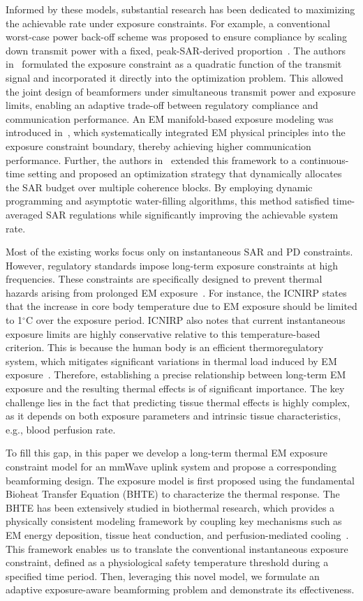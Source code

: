 \documentclass[journal]{IEEEtran}
\begin{document}
Informed by these models, substantial research has been dedicated to maximizing the achievable rate under exposure constraints. For example, a conventional worst-case power back-off scheme was proposed to ensure compliance by scaling down transmit power with a fixed, peak-SAR-derived proportion~\cite{ref14}. The authors in~\cite{ref15} formulated the exposure constraint as a quadratic function of the transmit signal and incorporated it directly into the optimization problem. This allowed the joint design of beamformers under simultaneous transmit power and exposure limits, enabling an adaptive trade-off between regulatory compliance and communication performance. An EM manifold-based exposure modeling was introduced in~\cite{ref16}, which systematically integrated EM physical principles into the exposure constraint boundary, thereby achieving higher communication performance. Further, the authors in~\cite{ref17} extended this framework to a continuous-time setting and proposed an optimization strategy that dynamically allocates the SAR budget over multiple coherence blocks. By employing dynamic programming and asymptotic water-filling algorithms, this method satisfied time-averaged SAR regulations while significantly improving the achievable system rate.

Most of the existing works focus only on instantaneous SAR and PD constraints. However, regulatory standards impose long-term exposure constraints at high frequencies. These constraints are specifically designed to prevent thermal hazards arising from prolonged EM exposure~\cite{ref18}. For instance, the ICNIRP states that the increase in core body temperature due to EM exposure should be limited to 1$^\circ$C over the exposure period. ICNIRP also notes that current instantaneous exposure limits are highly conservative relative to this temperature-based criterion. This is because the human body is an efficient thermoregulatory system, which mitigates significant variations in thermal load induced by EM exposure~\cite{ref20}. Therefore, establishing a precise relationship between long-term EM exposure and the resulting thermal effects is of significant importance. The key challenge lies in the fact that predicting tissue thermal effects is highly complex, as it depends on both exposure parameters and intrinsic tissue characteristics, e.g., blood perfusion rate.

To fill this gap, in this paper we develop a long-term thermal EM exposure constraint model for an mmWave uplink system and propose a corresponding beamforming design. The exposure model is first proposed using the fundamental Bioheat Transfer Equation (BHTE) to characterize the thermal response. The BHTE has been extensively studied in biothermal research, which provides a physically consistent modeling framework by coupling key mechanisms such as EM energy deposition, tissue heat conduction, and perfusion-mediated cooling~\cite{ref21}. This framework enables us to translate the conventional instantaneous exposure constraint, defined as a physiological safety temperature threshold during a specified time period. Then, leveraging this novel model, we formulate an adaptive exposure-aware beamforming problem and demonstrate its effectiveness.
\end{document}
